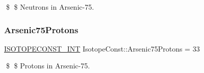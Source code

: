 \$ \$ Neutrons in Arsenic-\/75. \mbox{\label{group___isotope_const-_arsenic-_as75_ga4bf4a24a55ea339cf3b66050a4fd91c0}} 
\subsubsection{\texorpdfstring{Arsenic75\+Protons}{Arsenic75Protons}}
{\footnotesize\ttfamily \mbox{\hyperlink{group___isotope_const-_macros_ga5f18360b3e99483a35c32d789e62621c}{I\+S\+O\+T\+O\+P\+E\+C\+O\+N\+S\+T\+\_\+\+I\+NT}} Isotope\+Const\+::\+Arsenic75\+Protons = 33}

\$ \$ Protons in Arsenic-\/75. 